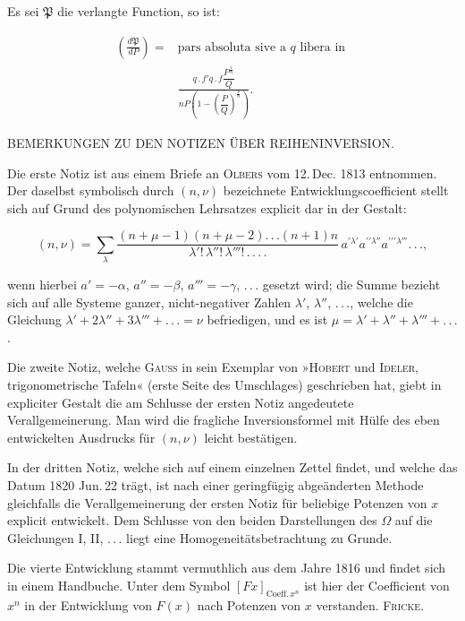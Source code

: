 \noindent\hspace*{\parindent}Es sei $\mathfrak{P}$ die verlangte Function, so ist:

\[
\begin{aligned}\left(\frac{d\mathfrak{P}}{dP}\right) ={}& \text{pars absoluta sive a } q \text{ libera in }\\ &\frac{q\,.\,f'q\,.\,f\dfrac{P^{\frac1n}}{Q}}{nP\left(1-\left(\dfrac{P}{Q}\right)^{\frac{\nu}{n}}\right)}.
\end{aligned}
\]



\begin{center}
BEMERKUNGEN ZU DEN NOTIZEN \"UBER REIHENINVERSION.
\end{center}

\noindent\hspace*{\parindent}Die erste Notiz ist aus einem Briefe an \textsc{Olbers} vom 12.\,Dec. 1813 entnommen. Der daselbst symbolisch durch $(n,\nu)$ bezeichnete Entwicklungscoefficient stellt sich auf Grund des polynomischen Lehrsatzes explicit dar in der Gestalt:

\[
(n,\nu) = \sum_\lambda \frac{(n+\mu-1)(n+\mu-2).\,.\,.(n+1)n}{\lambda'!\,\lambda''!\,\lambda'''!\,.\,.\,.\,.}\, a^{\prime\lambda'}a^{\prime\prime\lambda''}a^{\prime\prime\prime\lambda'''}.\,.\,.,
\]

\noindent wenn hierbei $a'=-\alpha$, $a''=-\beta$, $a'''=-\gamma$, .\,.\,. gesetzt wird; die Summe bezieht sich auf alle Systeme ganzer, nicht-negativer Zahlen $\lambda'$, $\lambda''$, .\,.\,., welche die Gleichung $\lambda'+2\lambda''+3\lambda'''+.\,.\,.=\nu$ befriedigen, und es ist $\mu=\lambda'+\lambda''+\lambda'''+.\,.\,.$.

Die zweite Notiz, welche \textsc{Gauss} in sein Exemplar von »\textsc{Hobert} und \textsc{Ideler}, trigonometrische Tafeln« (erste Seite des Umschlages) geschrieben hat, giebt in expliciter Gestalt die am Schlusse der ersten Notiz angedeutete Verallgemeinerung. Man wird die fragliche Inversionsformel mit H\"ulfe des eben entwickelten Ausdrucks f\"ur $(n,\nu)$ leicht best\"atigen.

In der dritten Notiz, welche sich auf einem einzelnen Zettel findet, und welche das Datum 1820 Jun.\,22 tr\"agt, ist nach einer geringf\"ugig abge\"anderten Methode gleichfalls die Verallgemeinerung der ersten Notiz f\"ur beliebige Potenzen von $x$ explicit entwickelt. Dem Schlusse von den beiden Darstellungen des $\Omega$ auf die Gleichungen I, II, .\,.\,. liegt eine Homogeneit\"atsbetrachtung zu Grunde.

Die vierte Entwicklung stammt vermuthlich aus dem Jahre 1816 und findet sich in einem Handbuche. Unter dem Symbol $[Fx]_{\text{Coeff.}\,x^n}$ ist hier der Coefficient von $x^n$ in der Entwicklung von $F(x)$ nach Potenzen von $x$ verstanden. \hfill\textsc{Fricke.}

